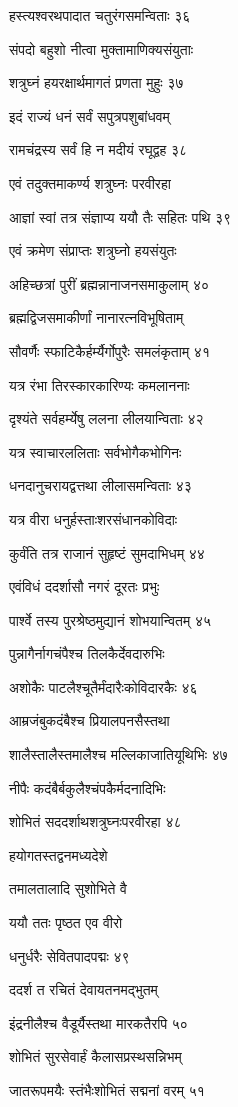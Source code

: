 हस्त्यश्वरथपादात चतुरंगसमन्विताः ३६

संपदो बहुशो नीत्वा मुक्तामाणिक्यसंयुताः

शत्रुघ्नं हयरक्षार्थमागतं प्रणता मुहुः ३७

इदं राज्यं धनं सर्वं सपुत्रपशुबांधवम्

रामचंद्रस्य सर्वं हि न मदीयं रघूद्वह ३८

एवं तदुक्तमाकर्ण्य शत्रुघ्नः परवीरहा

आज्ञां स्वां तत्र संज्ञाप्य ययौ तैः सहितः पथि ३९

एवं क्रमेण संप्राप्तः शत्रुघ्नो हयसंयुतः

अहिच्छत्रां पुरीं ब्रह्मन्नानाजनसमाकुलाम् ४०

ब्रह्मद्विजसमाकीर्णां नानारत्नविभूषिताम्

सौवर्णैः स्फाटिकैर्हर्म्यैर्गोपुरैः समलंकृताम् ४१

यत्र रंभा तिरस्कारकारिण्यः कमलाननाः

दृश्यंते सर्वहर्म्येषु ललना लीलयान्विताः ४२

यत्र स्वाचारललिताः सर्वभोगैकभोगिनः

धनदानुचरायद्वत्तथा लीलासमन्विताः ४३

यत्र वीरा धनुर्हस्ताःशरसंधानकोविदाः

कुर्वंति तत्र राजानं सुहृष्टं सुमदाभिधम् ४४

एवंविधं ददर्शासौ नगरं दूरतः प्रभुः

पार्श्वे तस्य पुरश्रेष्ठमुद्यानं शोभयान्वितम् ४५

पुन्नागैर्नागचंपैश्च तिलकैर्देवदारुभिः

अशोकैः पाटलैश्चूतैर्मंदारैःकोविदारकैः ४६

आम्रजंबुकदंबैश्च प्रियालपनसैस्तथा

शालैस्तालैस्तमालैश्च मल्लिकाजातियूथिभिः ४७

नीपैः कदंबैर्बकुलैश्चंपकैर्मदनादिभिः

शोभितं सददर्शाथशत्रुघ्नःपरवीरहा ४८

हयोगतस्तद्वनमध्यदेशे

तमालतालादि सुशोभिते वै

ययौ ततः पृष्ठत एव वीरो

धनुर्धरैः सेवितपादपद्मः ४९

ददर्श त रचितं देवायतनमद्भुतम्

इंद्रनीलैश्च वैडूर्यैस्तथा मारकतैरपि ५०

शोभितं सुरसेवार्हं कैलासप्रस्थसन्निभम्

जातरूपमयैः स्तंभैःशोभितं सद्मनां वरम् ५१

